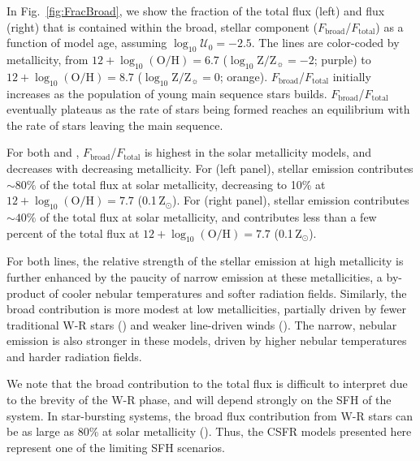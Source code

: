 \documentclass[preprint2]{aastex62}
\newcommand{\heii}{\ion{He}{2}}
\newcommand{\civ}{\ion{C}{4}}
\newcommand{\logten}{\ensuremath{\log_{10}}}
\newcommand{\logOH}{\ensuremath{\logten (\mathrm{O}/\mathrm{H})}\xspace}
\newcommand{\logZeq}[1]{\ensuremath{\logten \mathrm{Z}/\mathrm{Z}_{\sun} = #1}}
\newcommand{\logUeq}[1]{\ensuremath{\logten \mathcal{U}_0 = #1}}
\begin{document}
In Fig.~\ref{fig:FracBroad}, we show the fraction of the total \civ{} flux (left) and \heii{} flux (right) that is contained within the broad, stellar component ($F_{\mathrm{broad}}$/$F_{\mathrm{total}}$) as a function of model age, assuming \logUeq{-2.5}. The lines are color-coded by metallicity, from $12+\logOH=6.7$ (\logZeq{-2}; purple) to $12+\logOH=8.7$ (\logZeq{0}; orange). $F_{\mathrm{broad}}$/$F_{\mathrm{total}}$ initially increases as the population of young main sequence stars builds. $F_{\mathrm{broad}}$/$F_{\mathrm{total}}$ eventually plateaus as the rate of stars being formed reaches an equilibrium with the rate of stars leaving the main sequence.

For both \civ{} and \heii{}, $F_{\mathrm{broad}}$/$F_{\mathrm{total}}$ is highest in the solar metallicity models, and decreases with decreasing metallicity. For \civ{} (left panel), stellar emission contributes ${\sim}80\%$ of the total \civ{} flux at solar metallicity, decreasing to 10\% at $12+\logOH=7.7$ (0.1\,Z$_{\odot}$). For \heii{} (right panel), stellar emission contributes ${\sim}40\%$ of the total \heii{} flux at solar metallicity, and contributes less than a few percent of the total \heii{} flux at $12+\logOH=7.7$ (0.1\,Z$_{\odot}$).

For both lines, the relative strength of the stellar emission at high metallicity is further enhanced by the paucity of narrow emission at these metallicities, a by-product of cooler nebular temperatures and softer radiation fields. Similarly, the broad contribution is more modest at low metallicities, partially driven by fewer traditional W-R stars (\heii{}) and weaker line-driven winds (\civ{}). The narrow, nebular emission is also stronger in these models, driven by higher nebular temperatures and harder radiation fields.

We note that the broad contribution to the total \heii{} flux is difficult to interpret due to the brevity of the W-R phase, and will depend strongly on the SFH of the system. In star-bursting systems, the broad \heii{} flux contribution from W-R stars can be as large as 80\% at solar metallicity (). Thus, the CSFR models presented here represent one of the limiting SFH scenarios.
\end{document}
